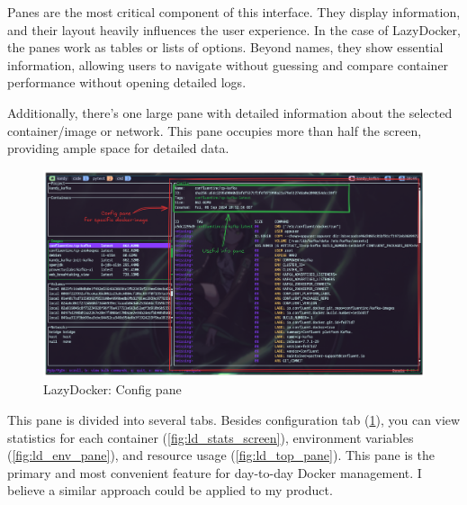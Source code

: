 \documentclass[10pt , a4paper]{report}
\begin{document}
Panes are the most critical component of this interface. They display information, and their layout heavily influences the user experience. In the case of LazyDocker, the panes work as tables or lists of options. Beyond names, they show essential information, allowing users to navigate without guessing and compare container performance without opening detailed logs.

Additionally, there’s one large pane with detailed information about the selected container/image or network. This pane occupies more than half the screen, providing ample space for detailed data.

\begin{figure}[htbp]
    \centering
    \includegraphics[width=.9\linewidth]{imgs/LazyDockerConfigPane.png}
    \caption{LazyDocker: Config pane}
    \label{fig:ld_big_pane}
\end{figure}


This pane is divided into several tabs. Besides configuration tab (\ref{fig:ld_big_pane}), you can view statistics for each container (\ref{fig:ld_stats_screen}), environment variables (\ref{fig:ld_env_pane}), and resource usage (\ref{fig:ld_top_pane}). This pane is the primary and most convenient feature for day-to-day Docker management. I believe a similar approach could be applied to my product.
\end{document}
